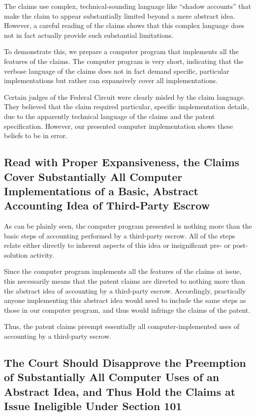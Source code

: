 \documentclass{scotus}
\begin{document}
The claims use complex, technical-sounding language like ``shadow accounts''
that make the claim to appear substantially limited beyond a mere abstract idea.
However, a careful reading of the claims shows that this complex language does
not in fact actually provide such substantial limitations.

To demonstrate this, we prepare a computer program that implements all the
features of the claims. The computer program is very short, indicating that the
verbose language of the claims does not in fact demand specific, particular
implementations but rather can expansively cover all implementations.

Certain judges of the Federal Circuit were clearly misled by the claim language.
They believed that the claim required particular, specific implementation
details, due to the apparently technical language of the claims and the patent
specification. However, our presented computer implementation shows these
beliefs to be in error.

\subsection{Read with Proper Expansiveness, the Claims Cover Substantially All
Computer Implementations of a Basic, Abstract Accounting Idea of Third-Party
Escrow}

As can be plainly seen, the computer program presented is nothing more than the
basic steps of accounting performed by a third-party escrow. All of the steps
relate either directly to inherent aspects of this idea or insignificant pre- or
post-solution activity.

Since the computer program implements all the features of the claims at issue,
this necessarily means that the patent claims are directed to nothing more than
the abstract idea of accounting by a third-party escrow. Accordingly,
practically anyone implementing this abstract idea would need to include the
same steps as those in our computer program, and thus would infringe the claims
of the patent.

Thus, the patent claims preempt essentially all computer-implemented uses of
accounting by a third-party escrow.

\subsection{The Court Should Disapprove the Preemption of Substantially All
Computer Uses of an Abstract Idea, and Thus Hold the Claims at Issue Ineligible
Under Section 101}
\end{document}
